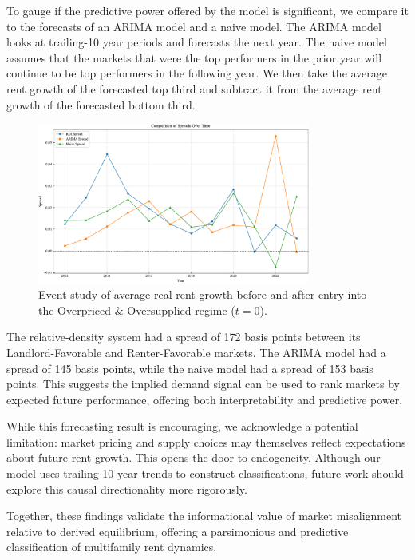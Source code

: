 \documentclass[APA,Times1COL]{WileyNJDv5} %
\begin{document}
To gauge if the predictive power offered by the model is significant, we compare it to the forecasts of an ARIMA model and a naive model. The ARIMA model looks at trailing-10 year periods and forecasts the next year. The naive model assumes that the markets that were the top performers in the prior year will continue to be top performers in the following year. We then take the average rent growth of the forecasted top third and subtract it from the average rent growth of the forecasted bottom third.

\begin{figure}[h]
	\centering
	\includegraphics[width=0.8\textwidth]{spread_comparison_over_time.pdf}
	\caption*{Event study of average real rent growth before and after entry into the Overpriced \& Oversupplied regime ($t=0$).}
	\label{fig:event_study}
\end{figure}


The relative-density system had a spread of 172 basis points between its Landlord-Favorable and Renter-Favorable markets. The ARIMA model had a spread of 145 basis points, while the naive model had a spread of 153 basis points. This suggests the implied demand signal can be used to rank markets by expected future performance, offering both interpretability and predictive power.

While this forecasting result is encouraging, we acknowledge a potential limitation: market pricing and supply choices may themselves reflect expectations about future rent growth. This opens the door to endogeneity. Although our model uses trailing 10-year trends to construct classifications, future work should explore this causal directionality more rigorously.

Together, these findings validate the informational value of market misalignment relative to derived equilibrium, offering a parsimonious and predictive classification of multifamily rent dynamics.
\end{document}
